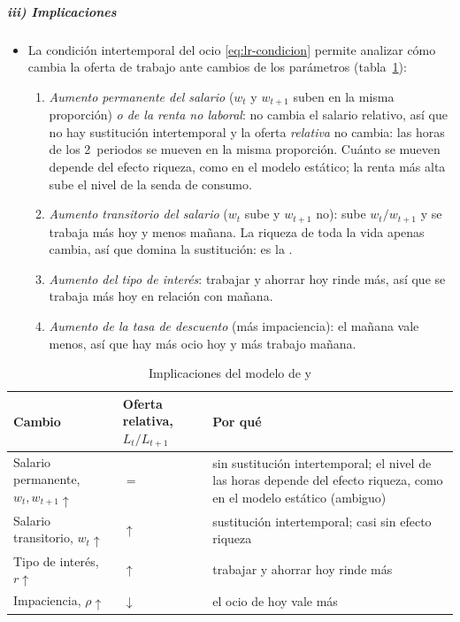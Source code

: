\documentclass[11pt]{article}
\begin{document}
\subparagraph{iii) Implicaciones}

\begin{itemize}
\item La condición intertemporal del ocio \eqref{eq:lr-condicion} permite analizar cómo cambia la oferta de trabajo ante cambios de los parámetros (tabla~\ref{tab:lr-implicaciones}):
  \begin{enumerate}
  \item \emph{Aumento permanente del salario} ($w_t$ y $w_{t+1}$ suben en la misma proporción) \emph{o de la renta no laboral}: no cambia el salario relativo, así que no hay sustitución intertemporal y la oferta \emph{relativa} no cambia: las horas de los 2~periodos se mueven en la misma proporción. Cuánto se mueven depende del efecto riqueza, como en el modelo estático; la renta más alta sube el nivel de la senda de consumo.
  \item \emph{Aumento transitorio del salario} ($w_t$ sube y $w_{t+1}$ no): sube $w_t/w_{t+1}$ y se trabaja más hoy y menos mañana. La riqueza de toda la vida apenas cambia, así que domina la sustitución: es la .
  \item \emph{Aumento del tipo de interés}: trabajar y ahorrar hoy rinde más, así que se trabaja más hoy en relación con mañana.
  \item \emph{Aumento de la tasa de descuento} (más impaciencia): el mañana vale menos, así que hay más ocio hoy y más trabajo mañana.
  \end{enumerate}
\end{itemize}

\begin{table}[H]
\centering
\caption{Implicaciones del modelo de  y }\label{tab:lr-implicaciones}
\begin{tabular}{>{\raggedright\arraybackslash}m{4.6cm}>{\centering\arraybackslash}m{2.6cm}>{\raggedright\arraybackslash}m{7.0cm}}
\toprule
\rowcolor{tceeazulpalido}\textbf{Cambio} & \textbf{Oferta relativa, $L_t/L_{t+1}$} & \textbf{Por qué}\\
\midrule
Salario permanente, $w_t,w_{t+1}\uparrow$ & $=$ & sin sustitución intertemporal; el nivel de las horas depende del efecto riqueza, como en el modelo estático (ambiguo)\\
\addlinespace[0.3em]
Salario transitorio, $w_t\uparrow$ & \textcolor{tceeverde}{$\uparrow$} & sustitución intertemporal; casi sin efecto riqueza\\
\addlinespace[0.3em]
Tipo de interés, $r\uparrow$ & \textcolor{tceeverde}{$\uparrow$} & trabajar y ahorrar hoy rinde más\\
\addlinespace[0.3em]
Impaciencia, $\rho\uparrow$ & \textcolor{tceerojo}{$\downarrow$} & el ocio de hoy vale más\\
\bottomrule
\end{tabular}
\end{table}
\end{document}
